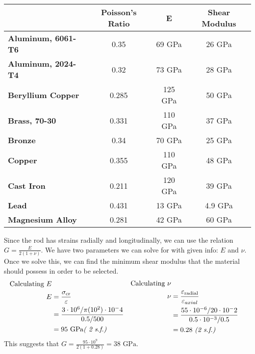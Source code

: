 \documentclass[answers]{exam}
\begin{document}
\begin{questions}
\begin{table}[H]
    \centering
    \renewcommand{\arraystretch}{1.5} %
    \begin{tabular}{|l|c|c|c|}
        \hline
         & \textbf{Poisson's Ratio} & \textbf{E} & \textbf{Shear Modulus} \\ \hline
        \textbf{Aluminum, 6061-T6} & 0.35 & 69 GPa & 26 GPa \\ \hline
        \textbf{Aluminum, 2024-T4} & 0.32 & 73 GPa & 28 GPa \\ \hline
        \textbf{Beryllium Copper} & 0.285 & 125 GPa & 50 GPa \\ \hline
        \textbf{Brass, 70-30} & 0.331 & 110 GPa & 37 GPa \\ \hline
        \textbf{Bronze} & 0.34 & 70 GPa & 25 GPa \\ \hline
        \textbf{Copper} & 0.355 & 110 GPa & 48 GPa \\ \hline
        \textbf{Cast Iron} & 0.211 & 120 GPa & 39 GPa \\ \hline
        \textbf{Lead} & 0.431 & 13 GPa & 4.9 GPa \\ \hline
        \textbf{Magnesium Alloy} & 0.281 & 42 GPa & 60 GPa \\ \hline
    \end{tabular}
\end{table}
\begin{solution}
    Since the rod has strains radially and longitudinally, we can use the relation $G=\frac{E}{2(1+\nu)}$. We have two parameters we can solve for with given info: $E$ and $\nu$. Once we solve this, we can find the minimum shear modulus that the material should possess in order to be selected.
    \begin{equation*}
        \begin{split}
            \text{Calculating $E$} \\
            E &= \frac{\sigma_\text{cr}}{\varepsilon} \\
              &= \frac{3\cdot 10^6 / \pi (10^2)\cdot10^-4}{0.5/500} \\
              &= 95 \text{ GPa} \text{\it ( 2 s.f.)}
        \end{split}
        \begin{split}
            \text{Calculating $\nu$} \\
            \nu &= \frac{\varepsilon_\text{radial}}{\varepsilon_{axial}} \\
                &= \frac{55\cdot 10^{-6}/20\cdot10^-2}{0.5 \cdot 10^{-3}/0.5} \\
                &= 0.28 \text{ \it (2 s.f.)}
        \end{split}
    \end{equation*}
    This suggests that $G = \frac{95\cdot 10^9}{2(1+0.28)} = 38 \text{ GPa}$.
    
    \noindent{}
\end{solution}


   \end{questions}
\end{document}
